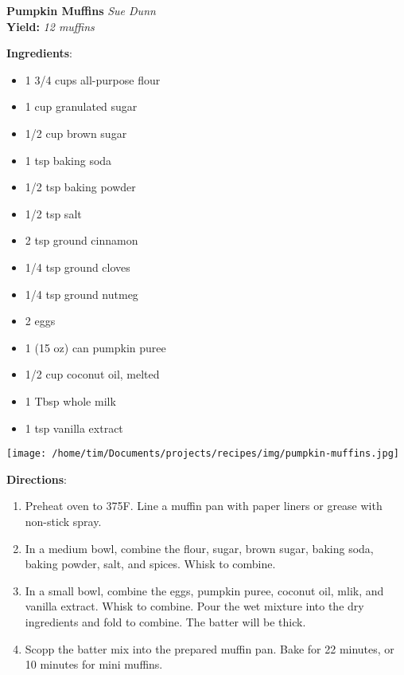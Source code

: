 \documentclass[11pt, twoside, openany]{book}
\begin{document}
\noindent\begin{minipage}[t]{\linewidth}%
{\Large\textbf{Pumpkin Muffins}} \label{pumpkin-muffins}\hfill\textit{Sue Dunn}\\
\textbf{Yield:} \textit{12 muffins}\\
\noindent\begin{minipage}[t]{0.78\linewidth}%
\textbf{Ingredients}:\vspace{-3mm}
\begin{multicols}{2}
\begin{itemize}\setlength\itemsep{-1mm}
\item 1 3/4 cups all-purpose flour
\item 1 cup granulated sugar
\item 1/2 cup brown sugar
\item 1 tsp baking soda
\item 1/2 tsp baking powder
\item 1/2 tsp salt
\item 2 tsp ground cinnamon
\item 1/4 tsp ground cloves
\item 1/4 tsp ground nutmeg
\item 2 eggs
\item 1 (15 oz) can pumpkin puree
\item 1/2 cup coconut oil, melted
\item 1 Tbsp whole milk
\item 1 tsp vanilla extract
\end{itemize}
\end{multicols}
\end{minipage}
\noindent\begin{minipage}[t]{0.18\linewidth}
\centering \strut\vspace*{-\baselineskip}\newline
\texttt{[image: /home/tim/Documents/projects/recipes/img/pumpkin-muffins.jpg]}\\
\end{minipage}\vspace{3mm}
\textbf{Directions}:
\vspace{-3mm}\begin{enumerate}\setlength\itemsep{-1mm}
\item Preheat oven to 375F. Line a muffin pan with paper liners or grease with non-stick spray.
\item In a medium bowl, combine the flour, sugar, brown sugar, baking soda, baking powder, salt, and spices. Whisk to combine.
\item In a small bowl, combine the eggs, pumpkin puree, coconut oil, mlik, and vanilla extract. Whisk to combine. Pour the wet mixture into the dry ingredients and fold to combine. The batter will be thick.
\item Scopp the batter mix into the prepared muffin pan. Bake for 22 minutes, or 10 minutes for mini muffins.
\end{enumerate}
\end{minipage}\vspace{8mm}
\end{document}
